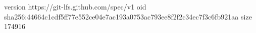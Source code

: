 version https://git-lfs.github.com/spec/v1
oid sha256:44664c1cdf5ff77e552ce04e7ac193a0753ac793ee8f2f2c34ec7f3c6fb921aa
size 174916
